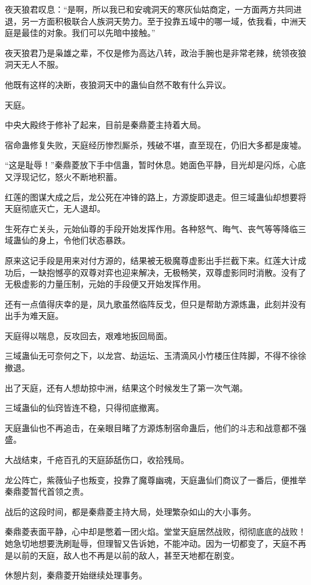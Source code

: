 \begin{this_body}
夜天狼君叹息：“是啊，所以我已和安魂洞天的寒灰仙姑商定，一方面两方共同进退，另一方面积极联合人族洞天势力。至于投靠五域中的哪一域，依我看，中洲天庭是最佳的对象。我们可以先暗中接触。”

夜天狼君乃是枭雄之辈，不仅是修为高达八转，政治手腕也是非常老辣，统领夜狼洞天无人不服。

他既有这样的决断，夜狼洞天中的蛊仙自然不敢有什么异议。

天庭。

中央大殿终于修补了起来，目前是秦鼎菱主持着大局。

宿命蛊修复失败，天庭经历惨烈厮杀，残破不堪，直至现在，仍旧大多都是废墟。

“这是耻辱！”秦鼎菱放下手中信蛊，暂时休息。她面色平静，目光却是闪烁，心底又浮现记忆，怒火不断地积蓄。

红莲的图谋大成之后，龙公死在冲锋的路上，方源旋即退走。但三域蛊仙却想要将天庭彻底灭亡，无人退却。

生死存亡关头，元始仙尊的手段开始发挥作用。各种怒气、晦气、丧气等等降临三域蛊仙的身上，令他们状态暴跌。

原来这记手段是用来对付方源的，结果被无极魔尊虚影出手拦截下来。红莲大计成功后，一缺抱憾亭的双尊对弈也迎来解决，无极畅笑，双尊虚影同时消散。没有了无极虚影的力量压制，元始的手段便又开始发挥作用。

还有一点值得庆幸的是，凤九歌虽然临阵反戈，但只是帮助方源炼蛊，此刻并没有出手为难天庭。

天庭得以喘息，反攻回去，艰难地扳回局面。

三域蛊仙无可奈何之下，以龙宫、劫运坛、玉清滴风小竹楼压住阵脚，不得不徐徐撤退。

出了天庭，还有人想劫掠中洲，结果这个时候发生了第一次气潮。

三域蛊仙的仙窍皆连不稳，只得彻底撤离。

天庭蛊仙也不再追击，在亲眼目睹了方源炼制宿命蛊后，他们的斗志和战意都不强盛。

大战结束，千疮百孔的天庭舔舐伤口，收拾残局。

龙公阵亡，紫薇仙子也叛变，投靠了魔尊幽魂，天庭蛊仙们商议了一番后，便推举秦鼎菱暂代首领之责。

战后的这段时间，都是秦鼎菱主持大局，处理繁杂如山的大小事务。

秦鼎菱表面平静，心中却是憋着一团火焰。堂堂天庭居然战败，彻彻底底的战败！她急切地想要洗刷耻辱，但理智又告诉她，不能冲动。因为一切都变了，天庭不再是以前的天庭，敌人也不再是以前的敌人，甚至天地都在剧变。

休憩片刻，秦鼎菱开始继续处理事务。


\end{this_body}
